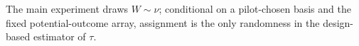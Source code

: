 The main experiment draws \(W\sim\nu\); conditional on a pilot-chosen basis and the fixed potential-outcome array, assignment is the only randomness in the design-based estimator of \(\tau\).